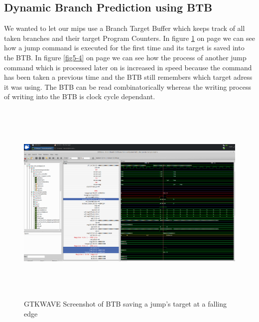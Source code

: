 \subsection{Dynamic Branch Prediction using BTB}
We wanted to let our mips use a Branch Target Buffer which keeps track of all taken branches and their target Program Counters. In figure \ref{fig5-3} on page \pageref{fig5-3} we can see how a jump command is executed for the first time and its target is saved into the BTB. In figure \ref{fig5-4} on page \pageref{fig5-4} we can see how the process of another jump command which is processed later on is increased in speed because the command has been taken a previous time and the BTB still remembers which target adress it was using. The BTB can be read combinatorically whereas the writing process of writing into the BTB is clock cycle dependant.

\begin{figure}
	\centering
	\includegraphics[width=1\textwidth, height=10cm, keepaspectratio]{pictures/BTB_FirstJump}
	\caption{GTKWAVE Screenshot of BTB saving a jump's target at a falling edge}
	\label{fig5-3}
\end{figure}

